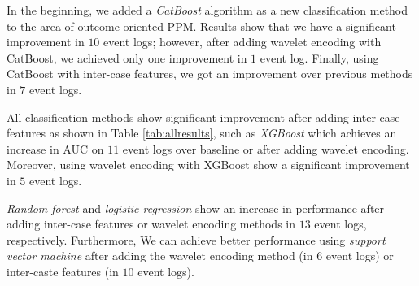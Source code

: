 In the beginning, we added a \textit{CatBoost} algorithm as a new classification method to the area of outcome-oriented PPM. Results show that we have a significant improvement in $10$ event logs; however, after adding wavelet encoding with CatBoost, we achieved only one improvement in $1$ event log. Finally, using CatBoost with inter-case features, we got an improvement over previous methods in $7$ event logs.

All classification methods show significant improvement after adding inter-case features as shown in Table \ref{tab:allresults}, such as \textit{XGBoost} which achieves an increase in AUC on $11$ event logs over baseline or after adding wavelet encoding. Moreover, using wavelet encoding with XGBoost show a significant improvement in $5$ event logs. 


\textit{Random forest} and \textit{logistic regression} show an increase in performance after adding inter-case features or wavelet encoding methods in $13$ event logs, respectively. Furthermore, We can achieve better performance using \textit{support vector machine} after adding the wavelet encoding method (in $6$ event logs) or inter-caste features (in $10$ event logs).



